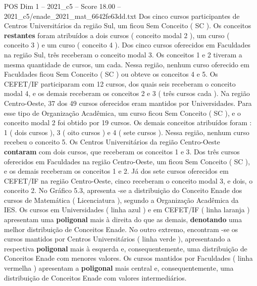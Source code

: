 \begin{textsample}{POS Dim 1 – 2021\_c5 – Score 18.00 – 2021\_c5/enade\_2021\_mat\_6642fe63dd.txt}
Dos cinco cursos participantes de Centros Universitários da região Sul, um ficou Sem Conceito ( SC ).
Os conceitos \textbf{restantes} foram atribuídos a dois cursos ( conceito modal 2 ), um curso ( conceito 3 ) e um curso ( conceito 4 ).
Dos cinco cursos oferecidos em Faculdades na região Sul, três receberam o conceito modal 3.
Os conceitos 1 e 2 tiveram a mesma quantidade de cursos, um cada.
Nessa região, nenhum curso oferecido em Faculdades ficou Sem Conceito ( SC ) ou obteve os conceitos 4 e 5.
Os CEFET/IF participaram com 12 cursos, dos quais seis receberam o conceito modal 4, e os demais receberam os conceitos 2 e 3 ( três cursos cada ).
Na região Centro-Oeste, 37 dos 49 cursos oferecidos eram mantidos por Universidades.
Para esse tipo de Organização Acadêmica, um curso ficou Sem Conceito ( SC ), e o conceito modal 2 foi obtido por 19 cursos.
Os demais conceitos atribuídos foram : 1 ( dois cursos ), 3 ( oito cursos ) e 4 ( sete cursos ).
Nessa região, nenhum curso recebeu o conceito 5.
Os Centros Universitários da região Centro-Oeste \textbf{contaram} com dois cursos, que receberam os conceitos 1 e 3.
Dos três cursos oferecidos em Faculdades na região Centro-Oeste, um ficou Sem Conceito ( SC ), e os demais receberam os conceitos 1 e 2.
Já dos sete cursos oferecidos em CEFET/IF na região Centro-Oeste, cinco receberam o conceito modal 3, e dois, o conceito 2.
No Gráfico 5.3, apresenta -se a distribuição do Conceito Enade dos cursos de Matemática ( Licenciatura ), segundo a Organização Acadêmica da IES.
Os cursos em Universidades ( linha azul ) e em CEFET/IF ( linha laranja ) apresentam uma \textbf{poligonal} mais à direita do que as demais, \textbf{denotando} uma melhor distribuição de Conceitos Enade.
No outro extremo, encontram -se os cursos mantidos por Centros Universitários ( linha verde ), apresentando a respectiva \textbf{poligonal} mais à esquerda e, consequentemente, uma distribuição de Conceitos Enade com menores valores.
Os cursos mantidos por Faculdades ( linha vermelha ) apresentam a \textbf{poligonal} mais central e, consequentemente, uma distribuição de Conceitos Enade com valores intermediários.

\end{textsample}
